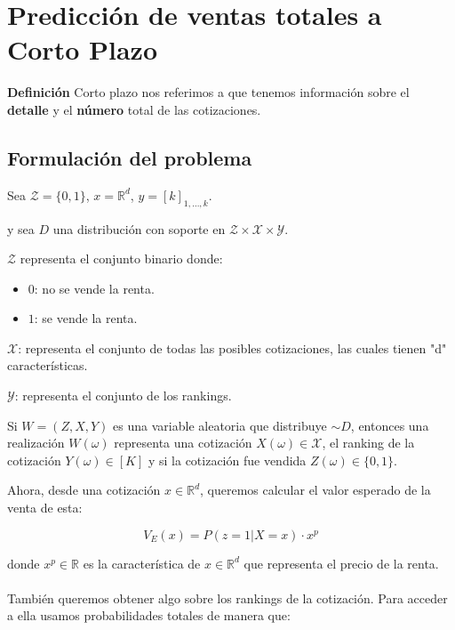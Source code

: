 
\usepackage{amsmath, amssymb}
\usepackage[utf8]{inputenc}


\section{Predicción de ventas totales a Corto Plazo}

\textbf{Definición} Corto plazo nos referimos a que tenemos información sobre el \textbf{detalle} y el \textbf{número} total de las cotizaciones.

\subsection{Formulación del problema}

Sea  $\mathcal{Z} = \{0,1\}$, \( x = \mathbb{R}^d \), \( y = [k]_{1,\ldots,k} \).

y sea \( D \) una distribución con soporte en \( \mathcal{Z} \times \mathcal{X} \times \mathcal{Y} \).

\( \mathcal{Z} \) representa el conjunto binario donde:
\begin{itemize}
    \item \( 0 \): no se vende la renta.
    \item \( 1 \): se vende la renta.
\end{itemize}

\( \mathcal{X} \): representa el conjunto de todas las posibles cotizaciones, las cuales tienen "d" características.

\( \mathcal{Y} \): representa el conjunto de los rankings.

Si \( W = (Z, X, Y) \) es una variable aleatoria que distribuye \( \sim D \), entonces una realización \( W(\omega) \) representa una cotización \( X(\omega) \in \mathcal{X} \), el ranking de la cotización \( Y(\omega) \in [K] \) y si la cotización fue vendida \( Z(\omega) \in \{0,1\} \).

Ahora, desde una cotización \( x \in \mathbb{R}^d \), queremos calcular el valor esperado de la venta de esta:

\[ V_E(x) = P(z=1|X=x) \cdot x^p \]

donde \( x^p \in \mathbb{R} \) es la característica de \( x \in \mathbb{R}^d \) que representa el precio de la renta.
\\
\\
También queremos obtener algo sobre los rankings de la cotización. Para acceder a ella usamos probabilidades totales de manera que:

